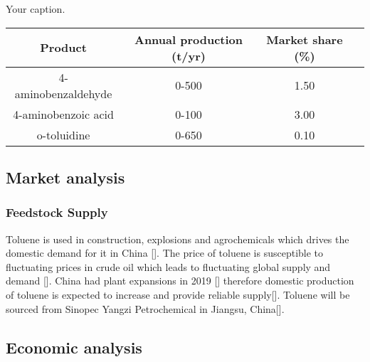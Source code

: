 \begin{center}
\caption{\label{tab:Producti}Your caption.}
\begin{tabular}{ |c|c|c|c| } 
\hline
Product & Annual production (t/yr) & Market share (\%) \\
\hline
4-aminobenzaldehyde & 0-500 & 1.50 \\ 
4-aminobenzoic acid & 0-100 & 3.00 \\ 
o-toluidine & 0-650 & 0.10 \\ 
\hline
\end{tabular}
\end{center}

\subsection{Market analysis}

\subsubsection{Feedstock Supply}
Toluene is used in construction, explosions and agrochemicals which drives the domestic demand for it in China []. The price of toluene is susceptible to fluctuating prices in crude oil which leads to fluctuating global supply and demand []. China had plant expansions in 2019 [] therefore domestic production of toluene is expected to increase and provide reliable supply[]. Toluene will be sourced from Sinopec Yangzi Petrochemical in Jiangsu, China[].


\subsection{Economic analysis}